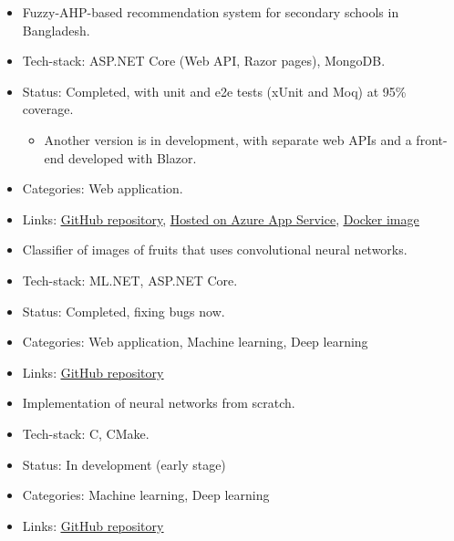 \begin{itemize}
\item Fuzzy-AHP-based recommendation system for secondary schools in Bangladesh.
\item Tech-stack: ASP.NET Core (Web API, Razor pages), MongoDB.
\item Status: Completed, with unit and e2e tests (xUnit and Moq) at 95\% coverage.
\begin{itemize}
    \item Another version is in development, with separate web APIs and a front-end developed with Blazor.
\end{itemize}
\item Categories: Web application.
\item Links: \href{https://github.com/maacpiash/KonSchool}{\underline{GitHub repository}}, \href{https://konschool.azurewebsites.net/}{\underline{Hosted on Azure App Service}}, \href{https://hub.docker.com/r/maacpiash/konschool}{\underline{Docker image}}
\end{itemize}
\smallskip
{}
\begin{itemize}
\item Classifier of images of fruits that uses convolutional neural networks.
\item Tech-stack: ML.NET, ASP.NET Core.
\item Status: Completed, fixing bugs now.
\item Categories: Web application, Machine learning, Deep learning
\item Links: \href{https://github.com/maacpiash/Connery}{\underline{GitHub repository}}
\end{itemize}
\smallskip
{}
\begin{itemize}
\item Implementation of neural networks from scratch.
\item Tech-stack: C, CMake.
\item Status: In development (early stage)
\item Categories: Machine learning, Deep learning
\item Links: \href{https://github.com/maacpiash/Winston}{\underline{GitHub repository}}
\end{itemize}
\smallskip
